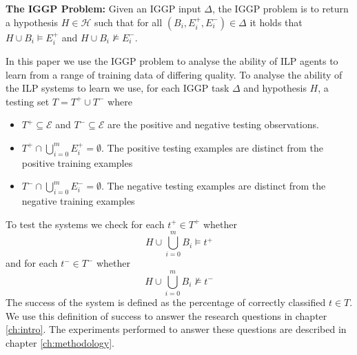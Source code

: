 \textbf{The IGGP Problem:} Given an IGGP input $\Delta$, the IGGP problem is to return a hypothesis $H \in \mathscr{H}$ such that for all $(B_i,E_i^+,E_i^-) \in \Delta$ it holds that $H \cup B_i \models E_i^+$ and
$H \cup B_i \not\models E_i^-$.

In this paper we use the IGGP problem to analyse the ability of ILP agents to learn from a range of training data of differing quality. To analyse the ability of the ILP systems to learn we use, for each IGGP task $\Delta$ and hypothesis $H$, a testing set $T = T^+\cup T^-$ where
\begin{itemize}
	\item $T^+ \subseteq \mathscr{E}$ and $T^-\subseteq \mathscr{E}$ are the positive and negative testing observations.
	\item $T^+ \cap \bigcup_{i=0}^m E_i^+  = \emptyset$. The positive testing examples are distinct from the positive training examples
	\item $T^- \cap \bigcup_{i=0}^m E_i^-  = \emptyset$. The negative testing examples are distinct from the negative training examples
\end{itemize}
To test the systems we check for each $t^+ \in T^+$ whether\[ H \cup \bigcup_{i=0}^m B_i \models t^+\] and for each $t^- \in T^-$  whether \[ H \cup \bigcup_{i=0}^m B_i \not\models t^-\]
The success of the system is defined as the percentage of correctly classified $t \in T$. We use this definition of success to answer the research questions in chapter \ref{ch:intro}. The experiments performed to answer these questions are described in chapter \ref{ch:methodology}.

